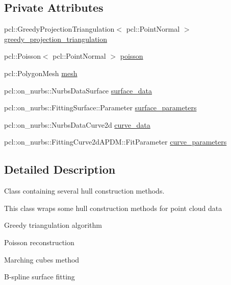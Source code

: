 \subsection*{Private Attributes}
\begin{DoxyCompactItemize}
\item 
pcl\+::\+Greedy\+Projection\+Triangulation$<$ pcl\+::\+Point\+Normal $>$ \hyperlink{classhull__abstraction_1_1_reconstructor_aeb53b00a5a6300f6fcbef59d6759f01b}{greedy\+\_\+projection\+\_\+triangulation}
\item 
pcl\+::\+Poisson$<$ pcl\+::\+Point\+Normal $>$ \hyperlink{classhull__abstraction_1_1_reconstructor_a60dfa765833af8d05f1426be0e96adb0}{poisson}
\item 
pcl\+::\+Polygon\+Mesh \hyperlink{classhull__abstraction_1_1_reconstructor_af0818936b15dd13f3a9fa3e70734cd57}{mesh}
\item 
pcl\+::on\+\_\+nurbs\+::\+Nurbs\+Data\+Surface \hyperlink{classhull__abstraction_1_1_reconstructor_a54297518de25118c2c44b5d8b778f65a}{surface\+\_\+data}
\item 
pcl\+::on\+\_\+nurbs\+::\+Fitting\+Surface\+::\+Parameter \hyperlink{classhull__abstraction_1_1_reconstructor_abae19ea237011f56fa300a2461a3f019}{surface\+\_\+parameters}
\item 
pcl\+::on\+\_\+nurbs\+::\+Nurbs\+Data\+Curve2d \hyperlink{classhull__abstraction_1_1_reconstructor_a1d2843c7331c7d363d02bc65c765512e}{curve\+\_\+data}
\item 
pcl\+::on\+\_\+nurbs\+::\+Fitting\+Curve2d\+A\+P\+D\+M\+::\+Fit\+Parameter \hyperlink{classhull__abstraction_1_1_reconstructor_af7033918ae29ef20bdd6d3db10175fd7}{curve\+\_\+parameters}
\end{DoxyCompactItemize}


\subsection{Detailed Description}
Class containing several hull construction methods. 

This class wraps some hull construction methods for point cloud data
\begin{DoxyItemize}
\item Greedy triangulation algorithm
\item Poisson reconstruction
\item Marching cubes method
\item B-\/spline surface fitting 
\end{DoxyItemize}

